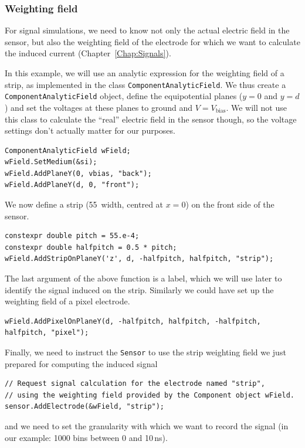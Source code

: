 \subsubsection{Weighting field}

For signal simulations, 
we need to know not only the actual electric field in the sensor, 
but also the weighting field of the electrode for which we want to 
calculate the induced current (Chapter~\ref{Chap:Signals}).

In this example, 
we will use an analytic expression for the weighting field of a strip, 
as implemented in the class \texttt{ComponentAnalyticField}. 
We thus create a \texttt{ComponentAnalyticField} object, 
define the equipotential planes ($y = 0$ and $y = d$) 
and set the voltages at these planes to ground and $V = V_{\text{bias}}$. 
We will not use this class to calculate the ``real'' electric field 
in the sensor though, so the voltage settings don't actually matter 
for our purposes.
\begin{lstlisting}
ComponentAnalyticField wField;
wField.SetMedium(&si);
wField.AddPlaneY(0, vbias, "back");
wField.AddPlaneY(d, 0, "front");
\end{lstlisting}
We now define a strip (55\, width, centred at $x = 0$) 
on the front side of the sensor.
\begin{lstlisting}
constexpr double pitch = 55.e-4;
constexpr double halfpitch = 0.5 * pitch;
wField.AddStripOnPlaneY('z', d, -halfpitch, halfpitch, "strip");
\end{lstlisting}
The last argument of the above function is a label, which we will use 
later to identify the signal induced on the strip.
Similarly we could have set up the weighting field of a pixel electrode.
\begin{lstlisting}
wField.AddPixelOnPlaneY(d, -halfpitch, halfpitch, -halfpitch, halfpitch, "pixel");
\end{lstlisting}

Finally, we need to instruct the \texttt{Sensor} 
to use the strip weighting field we just prepared 
for computing the induced signal
\begin{lstlisting}
// Request signal calculation for the electrode named "strip",
// using the weighting field provided by the Component object wField.
sensor.AddElectrode(&wField, "strip");
\end{lstlisting}
and we need to set the granularity with which we want to record the signal 
(in our example: 1000 bins between 0 and 10\,ns).

